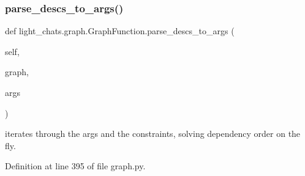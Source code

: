 \subsubsection{\texorpdfstring{parse\+\_\+descs\+\_\+to\+\_\+args()}{parse\_descs\_to\_args()}}
{\footnotesize\ttfamily def light\+\_\+chats.\+graph.\+Graph\+Function.\+parse\+\_\+descs\+\_\+to\+\_\+args (\begin{DoxyParamCaption}\item[{}]{self,  }\item[{}]{graph,  }\item[{}]{args }\end{DoxyParamCaption})}

\begin{DoxyVerb}iterates through the args and the constraints, solving dependency order on the
fly.
\end{DoxyVerb}
 

Definition at line 395 of file graph.\+py.


